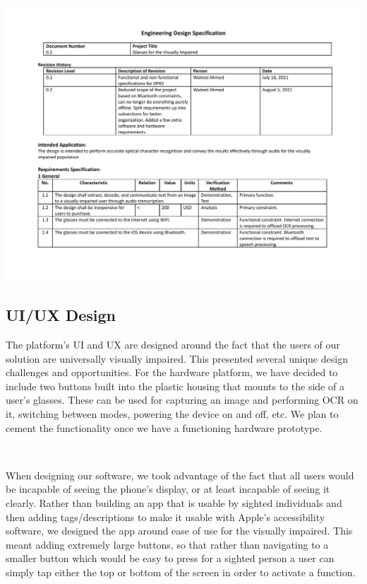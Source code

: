 \documentclass[a4paper,11pt]{article}
\begin{document}
\begin{landscape}
\begin{center}
        \includegraphics[page=3,width={0.86\linewidth}]{pdf/eds_0.2.pdf}
    \end{center}
\end{landscape}

\subsection{UI/UX Design}
\label{ui-ux-design}
The platform's UI and UX are designed around the fact that the users of our solution are universally visually impaired. This presented several unique design challenges and opportunities. For the hardware platform, we have decided to include two buttons built into the plastic housing that mounts to the side of a user's glasses. These can be used for capturing an image and performing OCR on it, switching between modes, powering the device on and off, etc. We plan to cement the functionality once we have a functioning hardware prototype. 

\

\noindent
When designing our software, we took advantage of the fact that all users would be incapable of seeing the phone's display, or at least incapable of seeing it clearly. Rather than building an app that is usable by sighted individuals and then adding tags/descriptions to make it usable with Apple's accessibility software, we designed the app around ease of use for the visually impaired. This meant adding extremely large buttons, so that rather than navigating to a smaller button which would be easy to press for a sighted person a user can simply tap either the top or bottom of the screen in order to activate a function.
\end{document}
